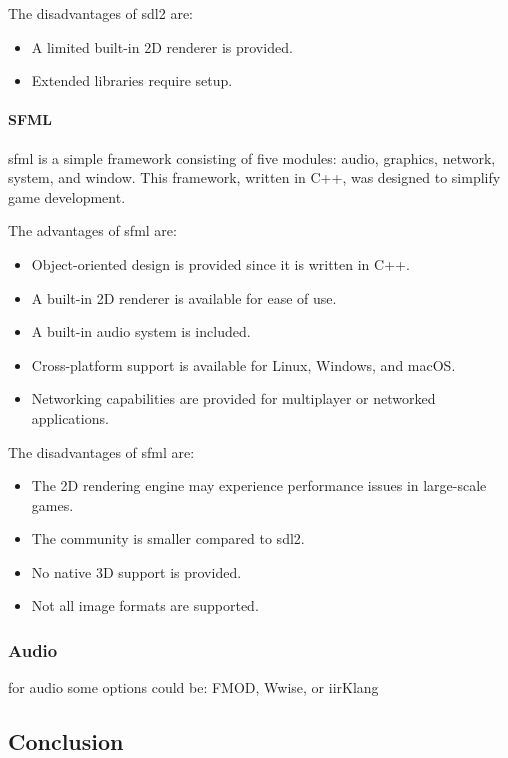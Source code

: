 \documentclass{projdoc}
\begin{document}
The disadvantages of \gls{sdl2} are:\noparbreak
\begin{itemize}
	\item A limited built-in 2D renderer is provided.
	\item Extended libraries require setup.
\end{itemize}

\paragraph{SFML}

\gls{sfml} is a simple framework consisting of five modules: audio, graphics,
network, system, and window. This framework, written in C++, was designed to simplify
game development.

The advantages of \gls{sfml} are:
\begin{itemize}
	\item Object-oriented design is provided since it is written in C++.
	\item A built-in 2D renderer is available for ease of use.
	\item A built-in audio system is included.
	\item Cross-platform support is available for Linux, Windows, and macOS.
	\item Networking capabilities are provided for multiplayer or networked
		applications.
\end{itemize}

The disadvantages of \gls{sfml} are:
\begin{itemize}
	\item The 2D rendering engine may experience performance issues in large-scale
		games.
	\item The community is smaller compared to \gls{sdl2}.
	\item No native 3D support is provided.
	\item Not all image formats are supported.
\end{itemize}

\subsubsection{Audio}

for audio some options could be: FMOD, Wwise, or iirKlang

\subsection{Conclusion}
\end{document}
